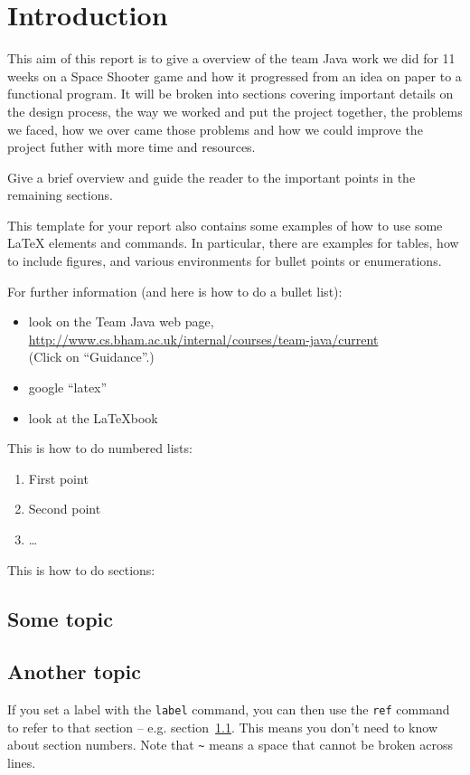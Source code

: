 
\chapter{Introduction}
\label{cha:introduction}

This aim of this report is to give a overview of the team Java work we did for 11 weeks on a Space Shooter game and how it progressed from an idea on paper to a functional program.
It will be broken into sections covering important details on the design process, the way we worked and put the project together, the problems we faced, how we over came those problems and how we could improve the project futher with more time and resources.


Give a brief overview and guide the reader to the important points
in the remaining sections.

This template for your report also contains some examples of how to use some
{\LaTeX} elements and commands. In particular, there are examples for tables,
how to include figures, and various environments for bullet points or
enumerations.

For further information (and here is how to do a bullet list):
\begin{itemize}
\item look on the Team Java web page,\\
\url{http://www.cs.bham.ac.uk/internal/courses/team-java/current}\\
  (Click on ``Guidance''.)
\item google ``latex''
\item look at the \LaTeX book \cite{latex}
\end{itemize}


This is how to do numbered lists:
\begin{enumerate}
\item First point
\item Second point
\item \ldots
\end{enumerate}

This is how to do sections:

\section{Some topic}\label{some}

\section{Another topic}\label{another}

If you set a label with the \texttt{label} command, you can then use
the \texttt{ref} command to refer to that section -- e.g.
section~\ref{some}. This means you don't need to know about section
numbers. Note that \texttt{\~} means a space that cannot be broken
across lines.
